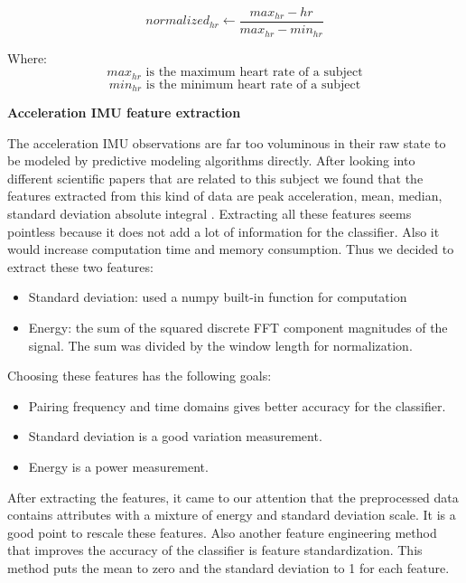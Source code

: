 \documentclass[12pt, a4paper, onecolumn, oneside, parskip=half]{scrartcl}
\begin{document}
\begin{equation}
\label{eq:heart_rate_normalization}
normalized_{hr} \leftarrow \frac{max_{hr} - hr}{max_{hr} - min_{hr}}
\end{equation}

Where: 
$$max_{hr}   \text{ is the maximum heart rate of a subject}  $$ 
$$min_{hr}   \text{ is the minimum heart rate of a subject}  $$


\textbf{Acceleration IMU feature extraction}

The acceleration IMU observations are far too voluminous in their raw state to be modeled by predictive modeling algorithms directly. After looking into different scientific papers that are related to this subject we found that the features extracted from this kind of data are peak acceleration, mean, median, standard deviation absolute integral  \cite{Attila_2012}\cite{Attila_2013}.
Extracting all these features seems pointless because it does not add a lot of information for the classifier. Also it would increase computation time and memory consumption. Thus we decided to extract these two features:
\begin{itemize}
\item Standard deviation: used a numpy built-in function for computation
\item Energy: the sum of the squared discrete FFT component magnitudes of the signal. The sum was divided by the window length for normalization. 
\end{itemize}

Choosing these features has the following goals:
\begin{itemize}
\item Pairing frequency and time domains gives better accuracy for the classifier.
\item Standard deviation is a good variation measurement.
\item Energy is a power measurement.
\end{itemize}



After extracting the features, it came to our attention that the preprocessed data contains attributes with a mixture of energy and standard deviation scale. It is a good point to rescale these features. Also another feature engineering method that improves the accuracy of the classifier is feature standardization. This method puts the mean to zero and the standard deviation to 1 for each feature.

\end{document}
